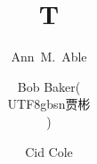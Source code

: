 \documentclass{aa}
\usepackage{CJKutf8}

\title{T}
\author{
         Ann~M.~Able \inst{\ref{X}}
    \and Bob Baker(\begin{CJK*}{UTF8}{gbsn}贾彬\end{CJK*}) \inst{\ref{X},\ref{Y}}
    \and Cid Cole\inst{\ref{Y}}
}
\maketitle
Text.

